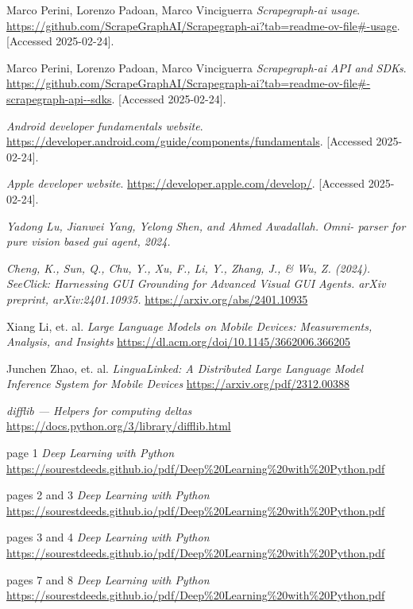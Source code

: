 \documentclass[licencjacka,en]{pracamgr}
\begin{document}
\begin{thebibliography}{99}
Marco Perini, Lorenzo Padoan, Marco Vinciguerra
\textit{Scrapegraph-ai usage}.
\url{https://github.com/ScrapeGraphAI/Scrapegraph-ai?tab=readme-ov-file#-usage}.
[Accessed 2025-02-24].

Marco Perini, Lorenzo Padoan, Marco Vinciguerra
\textit{Scrapegraph-ai API and SDKs}.
\url{https://github.com/ScrapeGraphAI/Scrapegraph-ai?tab=readme-ov-file#-scrapegraph-api--sdks}.
[Accessed 2025-02-24].

\textit{Android developer fundamentals website}.
\url{https://developer.android.com/guide/components/fundamentals}.
[Accessed 2025-02-24].

\textit{Apple developer website}.
\url{https://developer.apple.com/develop/}.
[Accessed 2025-02-24].

\textit{Yadong Lu, Jianwei Yang, Yelong Shen, and Ahmed Awadallah. Omni-
parser for pure vision based gui agent, 2024.}

\textit{Cheng, K., Sun, Q., Chu, Y., Xu, F., Li, Y., Zhang, J., \& Wu, Z. (2024). SeeClick: Harnessing GUI Grounding for Advanced Visual GUI Agents. arXiv preprint, arXiv:2401.10935.} \url{https://arxiv.org/abs/2401.10935}

Xiang Li, et. al.
\textit{Large Language Models on Mobile Devices: Measurements, Analysis, and Insights}
\url{https://dl.acm.org/doi/10.1145/3662006.366205}

Junchen Zhao, et. al.
\textit{LinguaLinked: A Distributed Large Language Model Inference System for Mobile Devices}
\url{https://arxiv.org/pdf/2312.00388}

\textit{difflib — Helpers for computing deltas}
\url{https://docs.python.org/3/library/difflib.html}

page 1
\textit{Deep Learning with Python}
\url{https://sourestdeeds.github.io/pdf/Deep%20Learning%20with%20Python.pdf}

pages 2 and 3
\textit{Deep Learning with Python}
\url{https://sourestdeeds.github.io/pdf/Deep%20Learning%20with%20Python.pdf}

pages 3 and 4
\textit{Deep Learning with Python}
\url{https://sourestdeeds.github.io/pdf/Deep%20Learning%20with%20Python.pdf}

pages 7 and 8
\textit{Deep Learning with Python}
\url{https://sourestdeeds.github.io/pdf/Deep%20Learning%20with%20Python.pdf}


\end{thebibliography}
\end{document}
